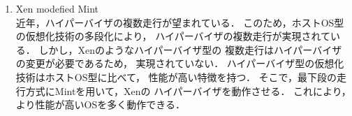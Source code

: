 \documentclass[12pt]{jsarticle}
\begin{document}
\begin{description}
        \begin{enumerate}
            \item Xen modefied Mint\\
                近年，ハイパーバイザの複数走行が望まれている．
                このため，ホストOS型の仮想化技術の多段化により，
                ハイパーバイザの複数走行が実現されている．
                しかし，Xenのようなハイパーバイザ型の
                複数走行はハイパーバイザの変更が必要であるため，
                実現されていない．
                ハイパーバイザ型の仮想化技術はホストOS型に比べて，
                性能が高い特徴を持つ．
                そこで，最下段の走行方式にMintを用いて，Xenの
                ハイパーバイザを動作させる．
                これにより，より性能が高いOSを多く動作できる．
        \end{enumerate}
\end{description}
\end{document}
